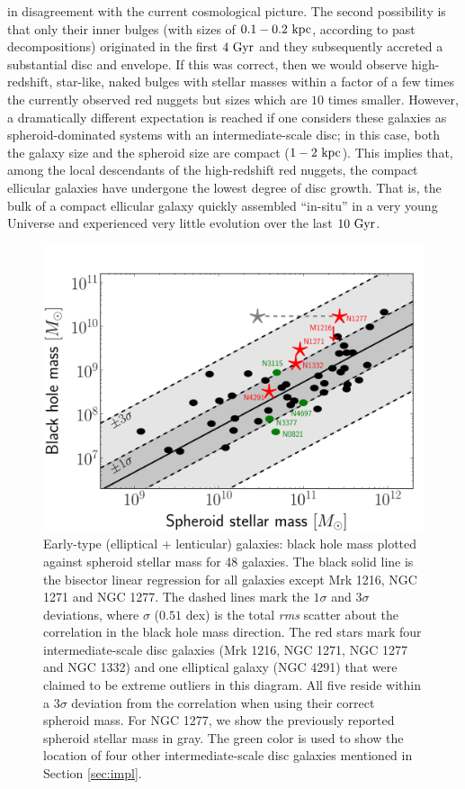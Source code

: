 \documentclass[useAMS,usenatbib,article]{mn2e}
\begin{document}
in disagreement with the current cosmological picture. 
The second possibility is that only their inner bulges (with sizes of $0.1-0.2~\rm kpc$, 
according to past decompositions) originated in the first $4~\rm Gyr$ 
and they subsequently accreted a substantial disc and envelope. 
If this was correct, then we would observe high-redshift, star-like, naked bulges with stellar masses 
within a factor of a few times the currently observed red nuggets but sizes which are $10$ times smaller. 
However, a dramatically different expectation is reached 
if one considers these galaxies as spheroid-dominated systems with an intermediate-scale disc; 
in this case, both the galaxy size and the spheroid size are compact ($1-2~\rm kpc$). 
This implies that, among the local descendants of the high-redshift red nuggets, 
the compact ellicular galaxies have undergone the lowest degree of disc growth. 
That is, the bulk of a compact ellicular galaxy quickly assembled ``in-situ'' in a very young Universe 
and experienced very little evolution over the last $10~\rm Gyr$.

\begin{figure}
\begin{center}
\includegraphics[width=\columnwidth]{images/mm.pdf}
\caption{Early-type (elliptical + lenticular) galaxies: 
black hole mass plotted against spheroid stellar mass for 48 galaxies. 
The black solid line is the bisector linear regression for all galaxies except Mrk 1216, NGC 1271 and NGC 1277. 
The dashed lines mark the $1\sigma$ and $3\sigma$ deviations, 
where $\sigma$ ($0.51$ dex) is the total \emph{rms} scatter about the correlation in the black hole mass direction. 
The red stars mark four intermediate-scale disc galaxies (Mrk 1216, NGC 1271, NGC 1277 and NGC 1332) and one elliptical galaxy (NGC 4291) 
that were claimed to be extreme outliers in this diagram. 
All five reside within a $3\sigma$ deviation from the correlation when using their correct spheroid mass. 
For NGC 1277, we show the previously reported spheroid stellar mass \citep{vandenbosch2012} in gray. 
The green color is used to show the location of four other intermediate-scale disc galaxies mentioned in Section \ref{sec:impl}.}
\label{fig:mm}
\end{center}
\end{figure}
\end{document}
